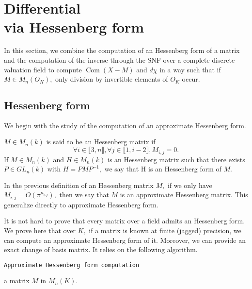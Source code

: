 \documentclass{sig-alternate-05-2015}
\DeclareMathOperator{\com}{Com}
\begin{document}
\section{Differential\\via Hessenberg form}
\label{sec:diffHess}

In this section, we combine the computation of an Hessenberg form
of a matrix and the computation of the inverse through the SNF
over a complete discrete valuation field
to compute $\com (X-M)$ and $d \chi$
in a way such that if $M \in M_n(O_K),$
only division by invertible elements of $O_K$
occur.

\subsection{Hessenberg form}

We begin with the study of the computation of
an approximate Hessenberg form.

\begin{deftn}
$M \in M_n (k)$ is said to be an Hessenberg matrix if
\[\forall i \in \llbracket 3, n \rrbracket, 
\forall j \in \llbracket 1, i-2 \rrbracket, M_{i,j}=0. \]
If $M \in M_n (k)$ and $H \in M_n (k)$ is an Hessenberg 
matrix such that there exists $P \in GL_n(k)$
with $H=PMP^{-1},$ we say that H is an Hessenberg form
of $M.$
\end{deftn}

\begin{deftn}
In the previous definition of an Hessenberg matrix $M,$
 if we only have $M_{i,j}= O(\pi^{n_{i,j}}),$ then we say
 that $M$ is an approximate Hessenberg matrix.
 This generalize directly to approximate Hessenberg form. 
\end{deftn}

It is not hard to prove that every matrix over a field admits
an Hessenberg form.
We prove here that over $K,$ if a matrix is 
known at finite (jagged) precision,
we can compute an approximate Hessenberg form of it.
Moreover, we can provide an exact change of basis matrix.
It relies on the following algorithm.


\noindent\hrulefill

 {\tt Approximate Hessenberg form computation}

 a matrix $M$ in $M_n(K).$

\smallskip
\end{document}

